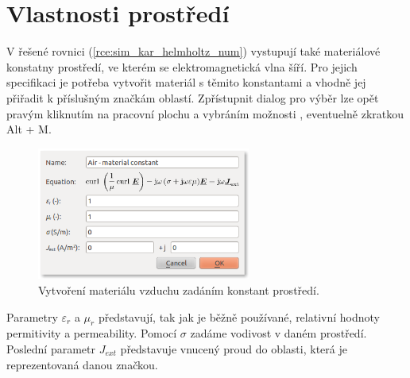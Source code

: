 \section{Vlastnosti prostředí}
V řešené rovnici (\ref{rce:sim_kar_helmholtz_num}) vystupují také materiálové konstatny prostředí, ve kterém se elektromagnetická vlna šíří. Pro jejich specifikaci je potřeba vytvořit materiál s těmito konstantami a vhodně jej přiřadit k příslušným značkám oblastí. Zpřístupnit dialog pro výběr lze opět pravým kliknutím na pracovní plochu a vybráním možnosti , eventuelně zkratkou Alt + M. 
\begin{figure}[!h]
	\centering
	\includegraphics[width=7cm]{sim_material.png}
	\caption{Vytvoření materiálu vzduchu zadáním konstant prostředí.}
	\label{obr:sim_material}
\end{figure}
Parametry $\varepsilon_r$ a $\mu_r$ představují, tak jak je běžně používané, relativní hodnoty permitivity a permeability. Pomocí $\sigma$ zadáme vodivost v daném prostředí. Poslední parametr $J_{ext}$ představuje vnucený proud do oblasti, která je reprezentovaná danou značkou.


